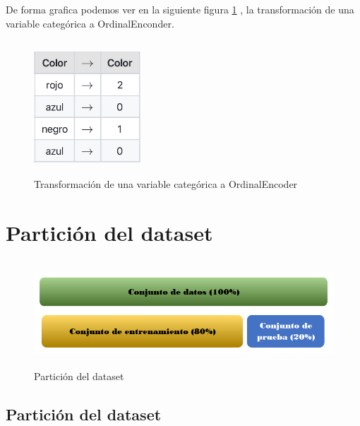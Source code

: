 De forma grafica podemos ver en la siguiente figura \ref{fig:Orencoder} , la transformación de una
variable categórica a OrdinalEnconder. \medskip

\begin{figure}[H]
    \centering
       \includegraphics[width=4cm, height=5cm ]{Imagenes/Encoder.PNG}
      \caption{Transformación de una variable categórica a OrdinalEncoder}
      \label{fig:Orencoder}
\end{figure}

\section{Partición del dataset}

    \begin{figure} [H]
        \centering
        \includegraphics[width=12cm, height=4cm ]{Imagenes/ParticionDEdatos.PNG }
        \caption{Partición del dataset}
        \label{fig:parti}
    \end{figure}

    

\subsection{Partición del dataset}



